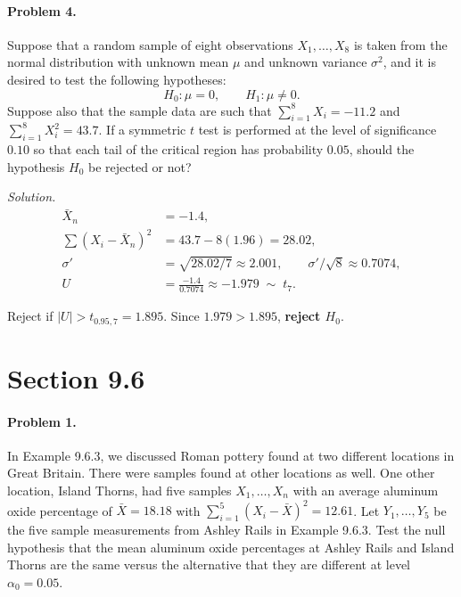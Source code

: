 \documentclass[11pt]{article}
\begin{document}
\newpage

\paragraph{Problem 4.}
Suppose that a random sample of eight observations $X_1, \dots, X_8$ is taken from
the normal distribution with unknown mean $\mu$ and unknown variance $\sigma^2$,
and it is desired to test the following hypotheses:
\[
    H_0\colon \mu = 0, \qquad H_1\colon \mu \neq 0.
\]
Suppose also that the sample data are such that $\sum_{i=1}^{8} X_i = -11.2$ and
$\sum_{i=1}^{8} X_i^2 = 43.7$. If a symmetric $t$ test is performed at the level of
significance $0.10$ so that each tail of the critical region has probability $0.05$,
should the hypothesis $H_0$ be rejected or not?

\textit{Solution.}
\begin{align*}
    \bar{X}_n &= -1.4, \\
    \sum (X_i - \bar{X}_n)^2 &= 43.7 - 8(1.96) = 28.02, \\
    \sigma' &= \sqrt{28.02/7} \approx 2.001, \qquad
    \sigma'/\sqrt{8} \approx 0.7074, \\
    U &= \tfrac{-1.4}{0.7074} \approx -1.979 \;\sim\; t_7.
\end{align*}

Reject if $|U| > t_{0.95,7} = 1.895$. Since $1.979 > 1.895$, \textbf{reject $H_0$}.

\newpage

\section*{Section 9.6}

\paragraph{Problem 1.}
In Example 9.6.3, we discussed Roman pottery found at two different locations in
Great Britain. There were samples found at other locations as well. One other
location, Island Thorns, had five samples $X_1, \dots, X_n$ with an average
aluminum oxide percentage of $\bar{X} = 18.18$ with
$\sum_{i=1}^{5}(X_i - \bar{X})^2 = 12.61$. Let $Y_1, \dots, Y_5$ be the five sample
measurements from Ashley Rails in Example 9.6.3. Test the null hypothesis that the
mean aluminum oxide percentages at Ashley Rails and Island Thorns are the same
versus the alternative that they are different at level $\alpha_0 = 0.05$.
\end{document}
